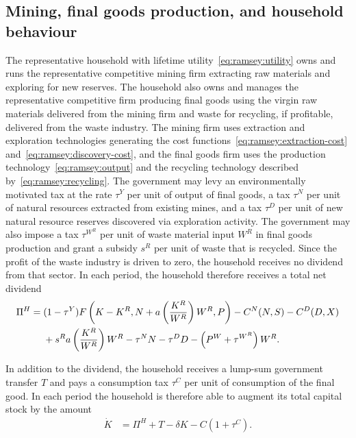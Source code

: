 \subsection{Mining, final goods production, and household behaviour}
\label{subsec:market-implementation:household}

The representative household with lifetime utility~\eqref{eq:ramsey:utility} owns and runs the representative competitive mining firm extracting raw materials and exploring for new reserves. The household also owns and manages the representative competitive firm producing final goods using the virgin raw materials delivered from the mining firm and waste for recycling, if profitable, delivered from the waste industry. The mining firm uses extraction and exploration technologies generating the cost functions~\eqref{eq:ramsey:extraction-cost} and~\eqref{eq:ramsey:discovery-cost}, and the final goods firm uses the production technology~\eqref{eq:ramsey:output} and the recycling technology described by~\eqref{eq:ramsey:recycling}. The government may levy an environmentally motivated tax at the rate $\tau^Y$ per unit of output of final goods, a tax $\tau^N$ per unit of natural resources extracted from existing mines, and a tax $\tau^D$ per unit of new natural resource reserves discovered via exploration activity. The government may also impose a tax $\tau^{W^R}$ per unit of waste material input $W^R$ in final goods production and grant a subsidy $s^R$ per unit of waste that is recycled. Since the profit of the waste industry is driven to zero, the household receives no dividend from that sector. In each period, the household therefore receives a total net dividend
\begin{align}
\Pi^H &= (1-\tau^Y)F\left(K-K^R, N + a\left(\frac{K^R}{W^R}\right)W^R, P\right) - C^N(N,S) - C^D(D,X)
\notag \\
&\phantom{{}={}} + s^R a\left(\frac{K^R}{W^R}\right)W^R - \tau^N N - \tau^D D - \left(P^W + \tau^{W^R}\right)W^R.
\label{eq:market:dividend}
\end{align}

In addition to the dividend, the household receives a lump-sum government transfer $T$ and pays a consumption tax $\tau^C$ per unit of consumption of the final good. In each period the household is therefore able to augment its total capital stock by the amount
\begin{align}
\dot{K} &= \Pi^H + T - \delta K - C(1+\tau^C).
\label{eq:market:capital-dynamics}
\end{align}

